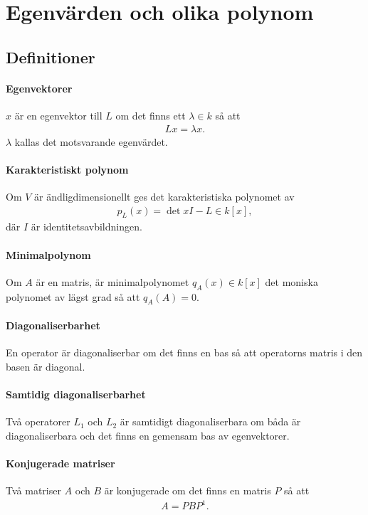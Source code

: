 \section{Egenvärden och olika polynom}

\subsection{Definitioner}

\paragraph{Egenvektorer}
$x$ är en egenvektor till $L$ om det finns ett $\lambda\in k$ så att
\begin{align*}
	Lx = \lambda x.
\end{align*}
$\lambda$ kallas det motsvarande egenvärdet.

\paragraph{Karakteristiskt polynom}
Om $V$ är ändligdimensionellt ges det karakteristiska polynomet av
\begin{align*}
	p_{L}(x) = \det{xI - L}\in k[x],
\end{align*}
där $I$ är identitetsavbildningen.

\paragraph{Minimalpolynom}
Om $A$ är en matris, är minimalpolynomet $q_{A}(x)\in k[x]$ det moniska polynomet av lägst grad så att $q_{A}(A) = 0$.

\paragraph{Diagonaliserbarhet}
En operator är diagonaliserbar om det finns en bas så att operatorns matris i den basen är diagonal.

\paragraph{Samtidig diagonaliserbarhet}
Två operatorer $L_{1}$ och $L_{2}$ är samtidigt diagonaliserbara om båda är diagonaliserbara och det finns en gemensam bas av egenvektorer.

\paragraph{Konjugerade matriser}
Två matriser $A$ och $B$ är konjugerade om det finns en matris $P$ så att
\begin{align*}
	A = PBP^{1}.
\end{align*}

